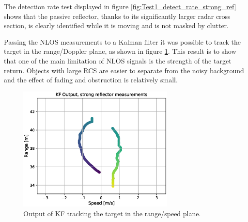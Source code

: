 The detection rate test displayed in figure \ref{fig:Test1_detect_rate_strong_ref} shows that the passive reflector, thanks to its significantly larger radar cross section, is clearly identified while it is moving and is not masked by clutter.

Passing the NLOS measurements to a Kalman filter it was possible to track the target in the range/Doppler plane, as shown in figure \ref{fig:Test1_kf_track_strong_ref}. This result is to show that one of the main limitation of NLOS signals is the strength of the target return. Objects with large RCS are easier to separate from the noisy background and the effect of fading and obstruction is relatively small.

\begin{figure}[H]
	\centering
	\includegraphics[width=0.7\textwidth]{Images/Test1/kf_track.eps}
	\caption{Output of KF tracking the target in the range/speed plane.}
	\label{fig:Test1_kf_track_strong_ref}
\end{figure}

